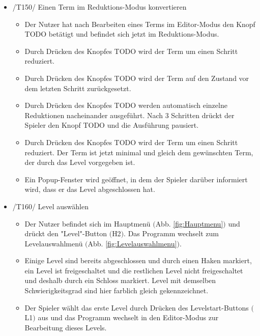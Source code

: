 \begin{itemize}
\item /T150/ Einen Term im Reduktions-Modus konvertieren
\begin{itemize}
\item Der Nutzer hat nach Bearbeiten eines Terms im Editor-Modus den Knopf TODO betätigt und befindet sich jetzt im Reduktions-Modus.
\item Durch Drücken des Knopfes TODO wird der Term um einen Schritt reduziert.
\item Durch Drücken des Knopfes TODO wird der Term auf den Zustand vor dem letzten Schritt zurückgesetzt.
\item Durch Drücken des Knopfes TODO werden automatisch einzelne Reduktionen nacheinander ausgeführt. Nach 3 Schritten drückt der Spieler den Knopf TODO und die Ausführung pausiert.
\item Durch Drücken des Knopfes TODO wird der Term um einen Schritt reduziert. Der Term ist jetzt minimal und gleich dem gewünschten Term, der durch das Level vorgegeben ist.
\item Ein Popup-Fenster wird geöffnet, in dem der Spieler darüber informiert wird, dass er das Level abgeschlossen hat.
\end{itemize}

\item /T160/ Level auswählen
\begin{itemize}
\item Der Nutzer befindet sich im Hauptmenü $($Abb. \ref{fig:Hauptmenu}$)$ und drückt den "Level"-Button $($H2$)$. Das Programm wechselt zum Levelauswahlmenü $($Abb. \ref{fig:Levelauswahlmenu}$)$.
\item Einige Level sind bereits abgeschlossen und durch einen Haken markiert, ein Level ist freigeschaltet und die restlichen Level nicht freigeschaltet und deshalb durch ein Schloss markiert. Level mit demselben Schwierigkeitsgrad sind hier farblich gleich gekennzeichnet.
\item Der Spieler wählt das erste Level durch Drücken des Levelstart-Buttons $($L1$)$ aus und das Programm wechselt in den Editor-Modus zur Bearbeitung dieses Levels.
\end{itemize}


\end{itemize}

